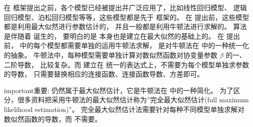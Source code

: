 \documentclass[letterpaper,10pt,english]{sphinxmanual}
\begin{document}
在  框架提出之前，各个模型已经被提出并广泛应用了，比如线性回归模型、
逻辑回归模型、泊松回归模型等等，这些模型都是先于  框架的。
在  提出前，这些模型都是利用最大似然进行参数估计的，
并且一般都是利用牛顿法进行求解的。
 算法是伴随着  诞生的，
要明白的是  本身也是建立在最大似然的基础上的。
在  提出前， 中的每个模型都需要单独的运用牛顿法求解，
 是对牛顿法在  中的一种统一化的抽象。
牛顿法中，每种模型需要单独计算对数似然函数对协变量参数 \(\beta\) 的一、二阶导数，
比较复杂。而  建立在  统一的表达式上，不需要为每个模型单独求参数的导数，
只需要替换相应的连接函数、连接函数导数、方差即可。

\begin{sphinxadmonition}{important}{重要:}
 仍然属于最大似然估计，它是牛顿法在  中的一种简化。
为了区分，很多资料把采用牛顿法的最大似然估计称为”完全最大似然估计(full maximum likelihood estimation)”。
完全最大似然估计法需要针对每种不同模型单独求解对数似然函数的导数，而  不需要。
\end{sphinxadmonition}
\end{document}
